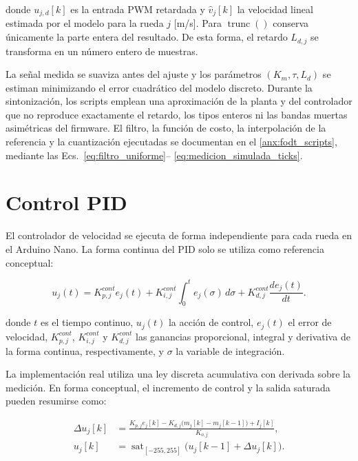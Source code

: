 \noindent donde $u_{j,d}[k]$ es la entrada PWM retardada y $\widehat{v}_j[k]$ la velocidad lineal estimada por el modelo para la rueda $j$ [m/s]. Para $\operatorname{trunc}()$ conserva únicamente la parte
entera del resultado. De esta forma, el retardo $L_{d,j}$ se transforma en
un número entero de muestras.

La señal medida se suaviza antes del ajuste y los parámetros
$(K_m,\tau,L_d)$ se estiman minimizando el error cuadrático del modelo discreto.
Durante la sintonización, los scripts emplean una aproximación de la planta y
del controlador que no reproduce exactamente el retardo, los tipos enteros ni
las bandas muertas asimétricas del firmware. El filtro, la función de costo, la
interpolación de la referencia y la cuantización ejecutadas se documentan en el
\ref{anx:fodt_scripts}, mediante las Ecs.~\eqref{eq:filtro_uniforme}--
\eqref{eq:medicion_simulada_ticks}.

\section{Control PID}
\label{sec:pid}

El controlador de velocidad se ejecuta de forma independiente para cada rueda en el Arduino Nano. La forma continua del PID solo se utiliza como referencia conceptual:

\begin{equation*}
u_j(t)
=
K_{p,j}^{cont}e_j(t)
+
K_{i,j}^{cont}\int_0^t e_j(\sigma)\,d\sigma
+
K_{d,j}^{cont}\frac{de_j(t)}{dt}.
\end{equation*}

\noindent donde $t$ es el tiempo continuo, $u_j(t)$ la acción de control, $e_j(t)$ el error de velocidad, $K_{p,j}^{cont}$, $K_{i,j}^{cont}$ y $K_{d,j}^{cont}$ las ganancias proporcional, integral y derivativa de la forma continua, respectivamente, y $\sigma$ la variable de integración.

\noindent La implementación real utiliza una ley discreta acumulativa con
derivada sobre la medición. En forma conceptual, el incremento de control y la
salida saturada pueden resumirse como:

\begin{align*}
\Delta u_j[k]
&=
\frac{
K_{p,j}e_j[k]
-
K_{d,j}\bigl(m_j[k]-m_j[k-1]\bigr)
+
I_j[k]
}{
K_{o,j}
},\\
u_j[k]
&=
\operatorname{sat}_{[-255,255]}
\bigl(u_j[k-1]+\Delta u_j[k]\bigr).
\end{align*}

